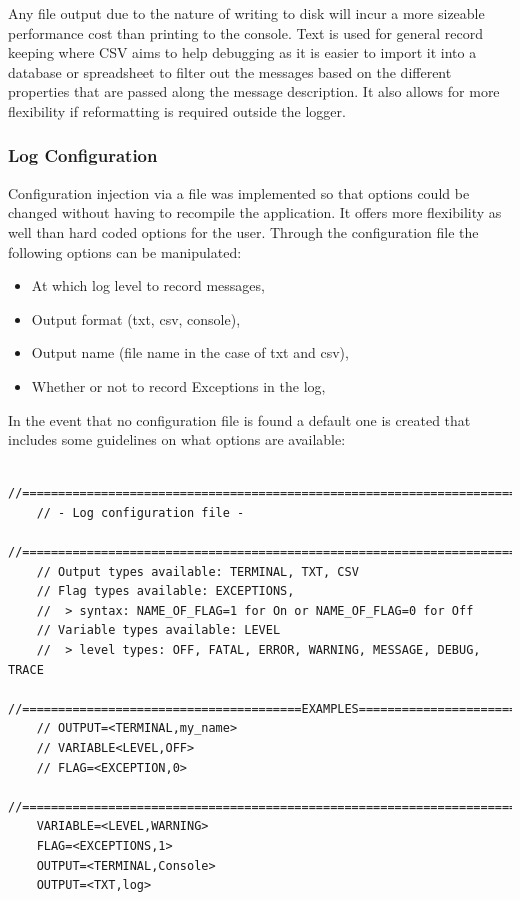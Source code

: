 Any file output due to the nature of writing to disk will incur a more sizeable performance cost than printing to the console. Text is used for general record keeping where CSV aims to help debugging as it is easier to import it into a database or spreadsheet to filter out the messages based on the different properties that are passed along the message description. It also allows for more flexibility if reformatting is required outside the logger.



\subsubsection{Log Configuration}

Configuration injection via a file was implemented so that options could be changed without having to recompile the application. It offers more flexibility as well than hard coded options for the user. Through the configuration file the following options can be manipulated:

\begin{itemize}
   	\item At which log level to record messages,
   	\item Output format (txt, csv, console),
   	\item Output name (file name in the case of txt and csv),
   	\item Whether or not to record Exceptions in the log,
\end{itemize}

In the event that no configuration file is found a default one is created that includes some guidelines on what options are available:

\begin{lstlisting}
	//======================================================================================
	// - Log configuration file - 
	//======================================================================================
	// Output types available: TERMINAL, TXT, CSV
	// Flag types available: EXCEPTIONS,
	// 	> syntax: NAME_OF_FLAG=1 for On or NAME_OF_FLAG=0 for Off
	// Variable types available: LEVEL
	// 	> level types: OFF, FATAL, ERROR, WARNING, MESSAGE, DEBUG, TRACE
	//=======================================EXAMPLES=======================================
	// OUTPUT=<TERMINAL,my_name>
	// VARIABLE<LEVEL,OFF>
	// FLAG=<EXCEPTION,0>
	//======================================================================================
	VARIABLE=<LEVEL,WARNING>
	FLAG=<EXCEPTIONS,1>
	OUTPUT=<TERMINAL,Console>
	OUTPUT=<TXT,log>
\end{lstlisting}

